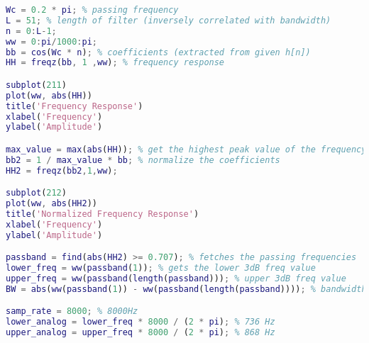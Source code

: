 \begin{lstlisting}[language=Matlab]
Wc = 0.2 * pi; % passing frequency
L = 51; % length of filter (inversely correlated with bandwidth)
n = 0:L-1;
ww = 0:pi/1000:pi;
bb = cos(Wc * n); % coefficients (extracted from given h[n])
HH = freqz(bb, 1 ,ww); % frequency response

subplot(211)
plot(ww, abs(HH))
title('Frequency Response')
xlabel('Frequency')
ylabel('Amplitude')

max_value = max(abs(HH)); % get the highest peak value of the frequency response
bb2 = 1 / max_value * bb; % normalize the coefficients
HH2 = freqz(bb2,1,ww);

subplot(212)
plot(ww, abs(HH2))
title('Normalized Frequency Response')
xlabel('Frequency')
ylabel('Amplitude')

passband = find(abs(HH2) >= 0.707); % fetches the passing frequencies
lower_freq = ww(passband(1)); % gets the lower 3dB freq value
upper_freq = ww(passband(length(passband))); % upper 3dB freq value
BW = abs(ww(passband(1)) - ww(passband(length(passband)))); % bandwidth

samp_rate = 8000; % 8000Hz
lower_analog = lower_freq * 8000 / (2 * pi); % 736 Hz
upper_analog = upper_freq * 8000 / (2 * pi); % 868 Hz
\end{lstlisting}